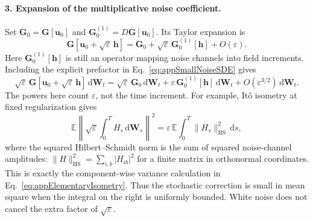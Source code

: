 \documentclass{article}
\begin{document}
\paragraph{3. Expansion of the multiplicative noise coefficient.}
Set $\mathbf G_0=\mathbf G[\mathbf u_0]$ and $\mathbf G_0^{(1)}=D\mathbf G[\mathbf u_0]$. Its Taylor expansion is
\begin{equation}
    \mathbf G[\mathbf u_0+\sqrt{\varepsilon}\,\mathbf h]
    =\mathbf G_0+\sqrt{\varepsilon}\,\mathbf G_0^{(1)}[\mathbf h]
    +O(\varepsilon).
\end{equation}
Here $\mathbf G_0^{(1)}[\mathbf h]$ is still an operator mapping noise channels into field increments. Including the explicit prefactor in Eq.~\eqref{eq:appSmallNoiseSDE} gives
\begin{equation}
    \sqrt{\varepsilon}\,\mathbf G[\mathbf u_0+\sqrt{\varepsilon}\,\mathbf h]\,\mathrm d\mathbf W_t
    =\sqrt{\varepsilon}\,\mathbf G_0\,\mathrm d\mathbf W_t
    +\varepsilon\,\mathbf G_0^{(1)}[\mathbf h]\,\mathrm d\mathbf W_t
    +O(\varepsilon^{3/2})\,\mathrm d\mathbf W_t.
    \label{eq:appNoiseTaylor}
\end{equation}
The powers here count $\varepsilon$, not the time increment. For example, It\^{o} isometry at fixed regularization gives
\begin{equation}
    \mathbb E\left\|\sqrt{\varepsilon}\int_0^T H_s\,\mathrm d\mathbf W_s\right\|^2
    =\varepsilon\,\mathbb E\int_0^T\|H_s\|_{\mathrm{HS}}^2\,\mathrm ds,
\end{equation}
where the squared Hilbert--Schmidt norm is the sum of squared noise-channel amplitudes: $\|H\|_{\mathrm{HS}}^2=\sum_{i,b}|H_{ib}|^2$ for a finite matrix in orthonormal coordinates. This is exactly the component-wise variance calculation in Eq.~\eqref{eq:appElementaryIsometry}. Thus the stochastic correction is small in mean square when the integral on the right is uniformly bounded. White noise does not cancel the extra factor of $\sqrt{\varepsilon}$.
\end{document}
